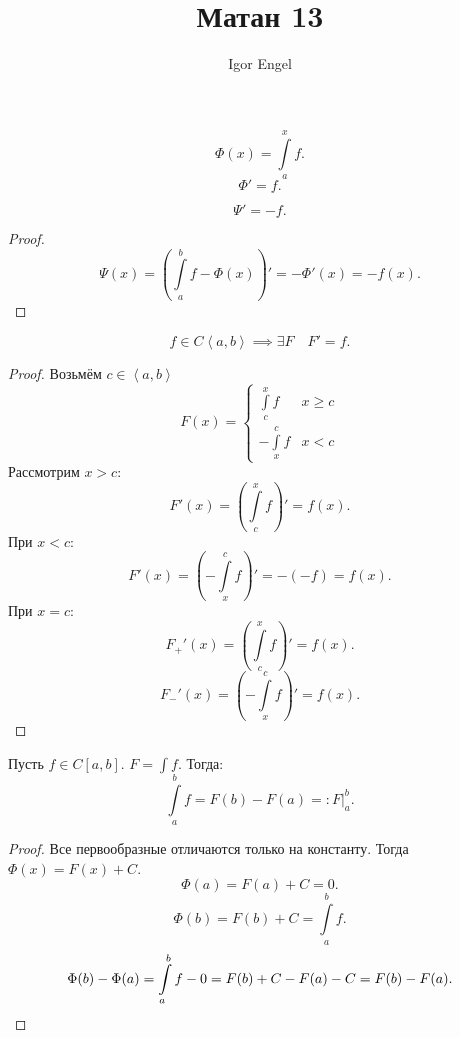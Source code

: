 \documentclass[11pt, oneside]{article}   	%
\title{Матан 13}
\author{Igor Engel}
\date{}
\begin{document}
\maketitle
\section{}
\begin{theorem}
    \[ \Phi(x) = \int\limits_{a}^{x} f  .\]
    \[ \Phi' = f .\] 
\end{theorem}
   \begin{tlemma}
       \[ \Psi' = -f .\]
       \begin{proof}
           \[ \Psi(x) = \left( \int\limits_{a}^{b} f - \Phi(x)  \right)' = -\Phi'(x) = -f(x)  .\]
       \end{proof}
   \end{tlemma}
   \begin{tlemma}
       \[ f\in C\left<a, b\right> \implies \exists{F}\quad F' = f .\]
      \begin{proof}
          Возьмём $c\in \left<a, b\right>$ 
           \begin{equation*}
               F(x) = \begin{cases}
                   \int\limits_{c}^{x} f & x \ge c\\
                   -\int\limits_{x}^{c} f & x < c 
               \end{cases}
            \end{equation*}
            Рассмотрим $x > c$:
            \[ F'(x) = \left( \int\limits_{c}^{x} f  \right)' = f(x) .\]
            При $x < c$:
            \[ F'(x) = \left( -\int\limits_{x}^{c} f  \right)' = -(-f) = f(x) .\]
            При $x=c$:
            \[ F_{+}'(x) = \left( \int\limits_{c}^{x} f  \right)' = f(x).\] 
            \[ F_{-}'(x) = \left( -\int\limits_{x}^{c} f  \right)' = f(x)  .\] 
      \end{proof} 
   \end{tlemma}
   \begin{theorem}
       Пусть $f\in C\left[a, b\right]$. $F = \int f$. Тогда:
       \[ \int\limits_{a}^{b} f = F(b) - F(a) =: \left. F\right|_{a}^{b}  .\]
        \begin{proof}
            Все первообразные отличаются только на константу. Тогда $\Phi(x) = F(x) + C$.\\
            \[ \Phi(a) = F(a) + C = 0.\]
            \[ \Phi(b) = F(b) + C = \int\limits_{a}^{b} f .\]
            \[ \Phi(b) - \Phi(a) = \int\limits_{a}^{b} f - 0 = F(b) + C - F(a) - C = F(b) - F(a)  .\qedhere\] 
        \end{proof}
   \end{theorem}
\end{document}
